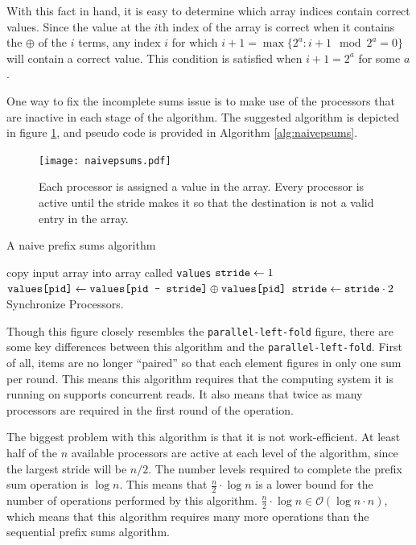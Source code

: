 \documentclass[12pt,twoside]{reedthesis}
\newcommand{\procedure}[1]{{\tt#1}}
\newcommand{\var}[1]{{\mbox{\tt#1}}}
\begin{document}
With this fact in hand, it is easy to determine which array indices contain correct values. Since the value at the $i$th index of the array is correct when it contains the $\oplus$ of the $i$ terms, any index $i$ for which $i+1 = \max \{ 2^a : i+1 \mod 2^a = 0 \}$ will contain a correct value. This condition is satisfied when $i+1 = 2^a$ for some $a$.
\vspace{1pc}

One way to fix the incomplete sums issue is to make use of the processors that are inactive in each stage of the algorithm. The suggested algorithm is depicted in figure \ref{fig:naivesums}, and pseudo code is provided in Algorithm \ref{alg:naivepsums}.

\begin{figure}[h!]
\begin{center}
\texttt{[image: naivepsums.pdf]}
\end{center}
\caption{Each processor is assigned a value in the array. Every processor is active until the stride makes it so that the destination is not a valid entry in the array.}
\label{fig:naivesums}
\end{figure}
\vspace{1pc}

\begin{algorithm}[h!]
\caption{A naive prefix sums algorithm}
\label{alg:naivepsums}
\begin{algorithmic}
\STATE copy input array into array called \var{values}
\STATE $\var{stride} \gets 1$
\WHILE{$\var{stride} < n$}
\IF{$\var{pid} - \var{stride} > 0$}
\STATE $\var{values[pid]} \gets \var{values[pid - stride]} \oplus \var{values[pid]} $
\STATE $\var{stride} \gets \var{stride}\cdot 2$
\ENDIF
\STATE Synchronize Processors.
\ENDWHILE
\end{algorithmic}
\end{algorithm}

Though this figure closely resembles the \procedure{parallel-left-fold} figure, there are some key differences between this algorithm and the \procedure{parallel-left-fold}. First of all, items are no longer ``paired'' so that each element figures in only one sum per round. This means this algorithm requires that the computing system it is running on supports concurrent reads. It also means that twice as many processors are required in the first round of the operation.

The biggest problem with this algorithm is that it is not work-efficient. At least half of the $n$ available processors are active at each level of the algorithm, since the largest stride will be $n/2$. The number levels required to complete the prefix sum operation is $\log n$. This means that $\frac{n}{2}\cdot\log n$ is a lower bound for the number of operations performed by this algorithm. $\frac{n}{2}\cdot \log n \in \mathcal{O}(\log n \cdot n)$, which means that this algorithm requires many more operations than the sequential prefix sums algorithm.
\end{document}
